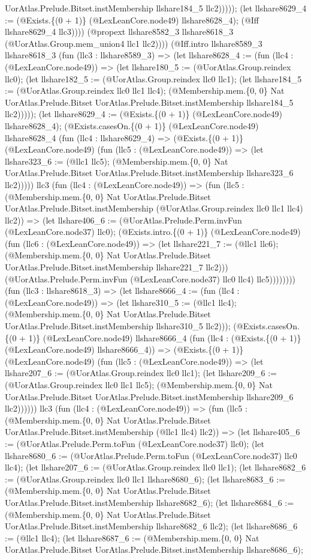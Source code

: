 \documentclass[11pt]{article}
\begin{document}
UorAtlas.Prelude.Bitset.instMembership llshare184\_5 llc2))))); (let llshare8629\_4 := (@Exists.\{(0 + 1)\} (@LexLeanCore.node49) llshare8628\_4); (@Iff llshare8629\_4 llc3)))) (@propext llshare8582\_3 llshare8618\_3 (@UorAtlas.Group.mem\_union4 llc1 llc2)))) (@Iff.intro llshare8589\_3 llshare8618\_3 (fun (llc3 : llshare8589\_3) => (let llshare8628\_4 := (fun (llc4 : (@LexLeanCore.node49)) => (let llshare180\_5 := (@UorAtlas.Group.reindex llc0); (let llshare182\_5 := (@UorAtlas.Group.reindex llc0 llc1); (let llshare184\_5 := (@UorAtlas.Group.reindex llc0 llc1 llc4); (@Membership.mem.\{0, 0\} Nat UorAtlas.Prelude.Bitset UorAtlas.Prelude.Bitset.instMembership llshare184\_5 llc2))))); (let llshare8629\_4 := (@Exists.\{(0 + 1)\} (@LexLeanCore.node49) llshare8628\_4); (@Exists.casesOn.\{(0 + 1)\} (@LexLeanCore.node49) llshare8628\_4 (fun (llc4 : llshare8629\_4) => (@Exists.\{(0 + 1)\} (@LexLeanCore.node49) (fun (llc5 : (@LexLeanCore.node49)) => (let llshare323\_6 := (@llc1 llc5); (@Membership.mem.\{0, 0\} Nat UorAtlas.Prelude.Bitset UorAtlas.Prelude.Bitset.instMembership llshare323\_6 llc2))))) llc3 (fun (llc4 : (@LexLeanCore.node49)) => (fun (llc5 : (@Membership.mem.\{0, 0\} Nat UorAtlas.Prelude.Bitset UorAtlas.Prelude.Bitset.instMembership (@UorAtlas.Group.reindex llc0 llc1 llc4) llc2)) => (let llshare406\_6 := (@UorAtlas.Prelude.Perm.invFun (@LexLeanCore.node37) llc0); (@Exists.intro.\{(0 + 1)\} (@LexLeanCore.node49) (fun (llc6 : (@LexLeanCore.node49)) => (let llshare221\_7 := (@llc1 llc6); (@Membership.mem.\{0, 0\} Nat UorAtlas.Prelude.Bitset UorAtlas.Prelude.Bitset.instMembership llshare221\_7 llc2))) (@UorAtlas.Prelude.Perm.invFun (@LexLeanCore.node37) llc0 llc4) llc5)))))))) (fun (llc3 : llshare8618\_3) => (let llshare8666\_4 := (fun (llc4 : (@LexLeanCore.node49)) => (let llshare310\_5 := (@llc1 llc4); (@Membership.mem.\{0, 0\} Nat UorAtlas.Prelude.Bitset UorAtlas.Prelude.Bitset.instMembership llshare310\_5 llc2))); (@Exists.casesOn.\{(0 + 1)\} (@LexLeanCore.node49) llshare8666\_4 (fun (llc4 : (@Exists.\{(0 + 1)\} (@LexLeanCore.node49) llshare8666\_4)) => (@Exists.\{(0 + 1)\} (@LexLeanCore.node49) (fun (llc5 : (@LexLeanCore.node49)) => (let llshare207\_6 := (@UorAtlas.Group.reindex llc0 llc1); (let llshare209\_6 := (@UorAtlas.Group.reindex llc0 llc1 llc5); (@Membership.mem.\{0, 0\} Nat UorAtlas.Prelude.Bitset UorAtlas.Prelude.Bitset.instMembership llshare209\_6 llc2)))))) llc3 (fun (llc4 : (@LexLeanCore.node49)) => (fun (llc5 : (@Membership.mem.\{0, 0\} Nat UorAtlas.Prelude.Bitset UorAtlas.Prelude.Bitset.instMembership (@llc1 llc4) llc2)) => (let llshare405\_6 := (@UorAtlas.Prelude.Perm.toFun (@LexLeanCore.node37) llc0); (let llshare8680\_6 := (@UorAtlas.Prelude.Perm.toFun (@LexLeanCore.node37) llc0 llc4); (let llshare207\_6 := (@UorAtlas.Group.reindex llc0 llc1); (let llshare8682\_6 := (@UorAtlas.Group.reindex llc0 llc1 llshare8680\_6); (let llshare8683\_6 := (@Membership.mem.\{0, 0\} Nat UorAtlas.Prelude.Bitset UorAtlas.Prelude.Bitset.instMembership llshare8682\_6); (let llshare8684\_6 := (@Membership.mem.\{0, 0\} Nat UorAtlas.Prelude.Bitset UorAtlas.Prelude.Bitset.instMembership llshare8682\_6 llc2); (let llshare8686\_6 := (@llc1 llc4); (let llshare8687\_6 := (@Membership.mem.\{0, 0\} Nat UorAtlas.Prelude.Bitset UorAtlas.Prelude.Bitset.instMembership llshare8686\_6); 
\end{document}
